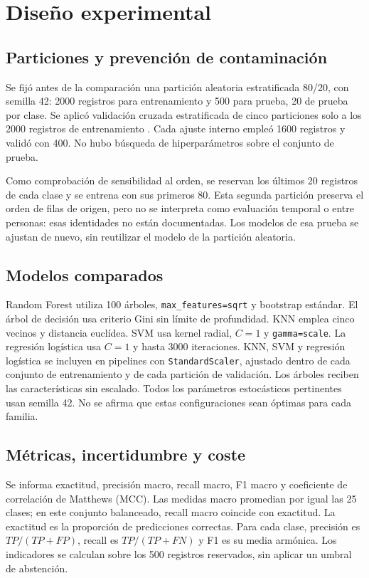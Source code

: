 \documentclass[11pt,a4paper]{article}
\begin{document}
\section{Diseño experimental}
\subsection{Particiones y prevención de contaminación}
Se fijó antes de la comparación una partición aleatoria estratificada 80/20, con semilla 42: 2000 registros para entrenamiento y 500 para prueba, 20 de prueba por clase. Se aplicó validación cruzada estratificada de cinco particiones solo a los 2000 registros de entrenamiento \cite{cv}. Cada ajuste interno empleó 1600 registros y validó con 400. No hubo búsqueda de hiperparámetros sobre el conjunto de prueba.

Como comprobación de sensibilidad al orden, se reservan los últimos 20 registros de cada clase y se entrena con sus primeros 80. Esta segunda partición preserva el orden de filas de origen, pero no se interpreta como evaluación temporal o entre personas: esas identidades no están documentadas. Los modelos de esa prueba se ajustan de nuevo, sin reutilizar el modelo de la partición aleatoria.

\subsection{Modelos comparados}
Random Forest utiliza 100 árboles, \texttt{max\_features=sqrt} y bootstrap estándar. El árbol de decisión usa criterio Gini sin límite de profundidad. KNN emplea cinco vecinos y distancia euclídea. SVM usa kernel radial, $C=1$ y \texttt{gamma=scale}. La regresión logística usa $C=1$ y hasta 3000 iteraciones. KNN, SVM y regresión logística se incluyen en pipelines con \texttt{StandardScaler}, ajustado dentro de cada conjunto de entrenamiento y de cada partición de validación. Los árboles reciben las características sin escalado. Todos los parámetros estocásticos pertinentes usan semilla 42. No se afirma que estas configuraciones sean óptimas para cada familia.

\subsection{Métricas, incertidumbre y coste}
Se informa exactitud, precisión macro, recall macro, F1 macro y coeficiente de correlación de Matthews (MCC). Las medidas macro promedian por igual las 25 clases; en este conjunto balanceado, recall macro coincide con exactitud. La exactitud es la proporción de predicciones correctas. Para cada clase, precisión es $TP/(TP+FP)$, recall es $TP/(TP+FN)$ y F1 es su media armónica. Los indicadores se calculan sobre los 500 registros reservados, sin aplicar un umbral de abstención.
\end{document}
